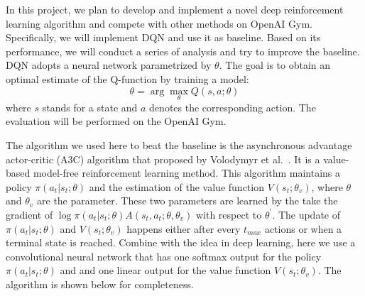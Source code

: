 
In this project, we plan to develop and implement a novel deep reinforcement learning algorithm and compete with other methods on OpenAI Gym. Specifically, we will implement DQN and use it as baseline. Based on its performance, we will conduct a series of analysis and try to improve the baseline.
%
DQN adopts a neural network parametrized by $\theta$. The goal is to obtain an optimal estimate of the Q-function by training a model:
\begin{equation*}
\theta = \arg\max_\theta Q(s,a;\theta)
\end{equation*}
where $s$ stands for a state and $a$ denotes the corresponding action. 
The evaluation will be performed on the OpenAI Gym.

The algorithm we used here to beat the baseline is the asynchronous advantage actor-critic (A3C) algorithm that proposed by Volodymyr et al.~\cite{mnih2016asynchronous}. It is a value-based model-free reinforcement learning method. This algorithm maintains a policy $\pi (a_{t}|s_{t};\theta)$ and the estimation of the value function $V(s_{t};\theta_{v})$, where $\theta$ and $\theta_{v}$ are the parameter. These two parameters are learned by the take the gradient of $\log \pi (a_{t}|s_{t};\theta) A(s_{t},a_{t};\theta,\theta_{v})$ with respect to $\theta^{\prime}$. The update of $\pi (a_{t}|s_{t};\theta)$ and $V(s_{t};\theta_{v})$ happens either after every $t_{max}$ actions or when a terminal state is reached. Combine with the idea in deep learning, here we use a convolutional neural network that has one softmax output for the policy $\pi (a_{t}|s_{t};\theta)$ and and
one linear output for the value function $V(s_{t};\theta_{v})$. The algorithm is shown below for completeness.

